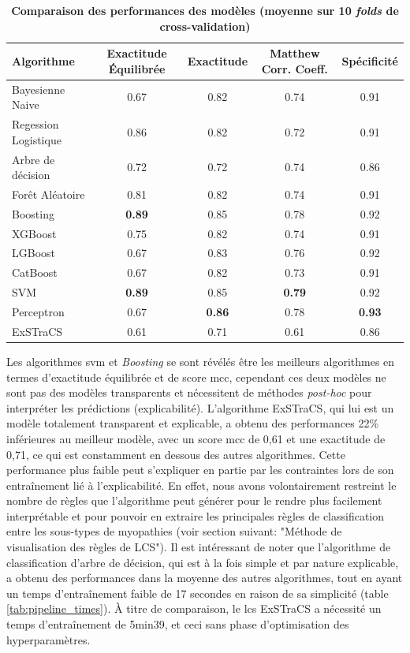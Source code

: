 \begin{table}[!ht]
\centering
\begin{tabular}{lcccc}
\hline
Algorithme & Exactitude Équilibrée & Exactitude & Matthew Corr. Coeff. & Spécificité  \\
\hline
Bayesienne Naive & 0.67 & 0.82 & 0.74 & 0.91 \\
Regession Logistique & 0.86 & 0.82 & 0.72 & 0.91 \\
Arbre de décision & 0.72 & 0.72 & 0.74 & 0.86 \\
Forêt Aléatoire & 0.81 & 0.82 & 0.74 & 0.91 \\
Boosting & \textbf{0.89} & 0.85 & 0.78 & 0.92 \\
XGBoost & 0.75 & 0.82 & 0.74 & 0.91 \\
LGBoost & 0.67 & 0.83 & 0.76 & 0.92 \\
CatBoost & 0.67 & 0.82 & 0.73 & 0.91 \\
SVM & \textbf{0.89} & 0.85 & \textbf{0.79} & 0.92 \\
Perceptron & 0.67 & \textbf{0.86} & 0.78 & \textbf{0.93}\\
ExSTraCS & 0.61 & 0.71 & 0.61 & 0.86 \\
\hline
\end{tabular}
\caption[Comparaison des performances des modèles (moyenne sur 10 folds de cross-validation)]{\textbf{Comparaison des performances des modèles (moyenne sur 10 \textit{folds} de cross-validation)}}
\label{table:ml_metrics}
\end{table}        
Les algorithmes \gls{svm} et \textit{Boosting } se sont révélés être les meilleurs algorithmes en termes d'exactitude équilibrée et de score \gls{mcc}, cependant ces deux modèles ne sont pas des modèles transparents et nécessitent de méthodes \textit{post-hoc} pour interpréter les prédictions (explicabilité). L'algorithme ExSTraCS, qui lui est un modèle totalement transparent et explicable, a obtenu des performances 22\% inférieures au meilleur modèle, avec un score \gls{mcc} de 0,61 et une exactitude de 0,71, ce qui est constamment en dessous des autres algorithmes. Cette performance plus faible peut s'expliquer en partie par les contraintes lors de son entraînement lié à l'explicabilité. En effet, nous avons volontairement restreint le nombre de règles que l'algorithme peut générer pour le rendre plus facilement interprétable et pour pouvoir en extraire les principales règles de classification entre les sous-types de myopathies (voir section suivant: "Méthode de visualisation des règles de LCS"). Il est intéressant de noter que l'algorithme de classification d'arbre de décision, qui est à la fois simple et par nature explicable, a obtenu des performances dans la moyenne des autres algorithmes, tout en ayant un temps d'entraînement faible de 17 secondes en raison de sa simplicité (table \ref{tab:pipeline_times}). À titre de comparaison, le \gls{lcs} ExSTraCS a nécessité un temps d'entraînement de 5min39, et ceci sans phase d'optimisation des hyperparamètres.
